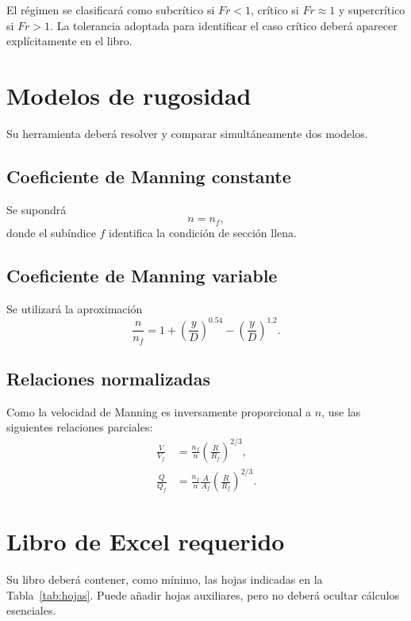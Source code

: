 \documentclass[12pt]{article}
\begin{document}
El régimen se clasificará como subcrítico si $Fr<1$, crítico si $Fr\approx 1$ y supercrítico si $Fr>1$. La tolerancia adoptada para identificar el caso crítico deberá aparecer explícitamente en el libro.

\section{Modelos de rugosidad}
Su herramienta deberá resolver y comparar simultáneamente dos modelos.

\subsection{Coeficiente de Manning constante}
Se supondrá
\[
n=n_f,
\]
donde el subíndice $f$ identifica la condición de sección llena.

\subsection{Coeficiente de Manning variable}
Se utilizará la aproximación
\begin{equation}
\frac{n}{n_f}=1+\left(\frac{y}{D}\right)^{0.54}
-\left(\frac{y}{D}\right)^{1.2}.
\end{equation}

\subsection{Relaciones normalizadas}
Como la velocidad de Manning es inversamente proporcional a $n$, use las siguientes relaciones parciales:
\begin{align*}
\frac{V}{V_f} &= \frac{n_f}{n}\left(\frac{R}{R_f}\right)^{2/3}, \\
\frac{Q}{Q_f} &= \frac{n_f}{n}\frac{A}{A_f}
\left(\frac{R}{R_f}\right)^{2/3}.
\end{align*}

\section{Libro de Excel requerido}
Su libro deberá contener, como mínimo, las hojas indicadas en la Tabla~\ref{tab:hojas}. Puede añadir hojas auxiliares, pero no deberá ocultar cálculos esenciales.
\end{document}
